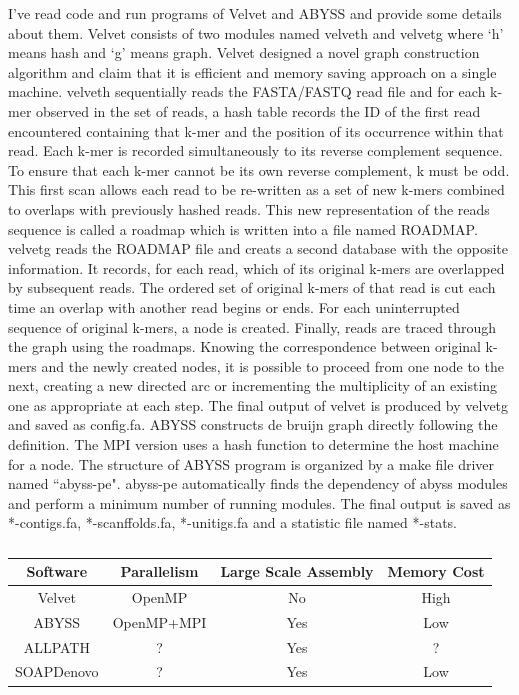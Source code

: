 \documentclass{article}
\begin{document}
I've read code and run programs of Velvet and ABYSS and provide some details about them. Velvet consists of two modules named velveth and velvetg where `h' means hash and `g' means graph. Velvet designed a novel graph construction algorithm and claim that it is efficient and memory saving approach on a single machine. velveth sequentially reads the FASTA/FASTQ read file and for each k-mer observed in the set of reads, a hash table records the ID of the first read encountered containing that k-mer and the position of its occurrence within that read. Each k-mer is recorded simultaneously to its reverse complement sequence. To ensure that each k-mer cannot be its own reverse complement, k must be odd. This first scan allows each read to be re-written as a set of new k-mers combined to overlaps with previously hashed reads. This new representation of the reads sequence is called a roadmap which is written into a file named ROADMAP. velvetg reads the ROADMAP file and creats a second database with the opposite information. It records, for each read, which of its original k-mers are overlapped by subsequent reads. The ordered set of original k-mers of that read is cut each time an overlap with another read begins or ends. For each uninterrupted sequence of original k-mers, a node is created. Finally, reads are traced through the graph using the roadmaps. Knowing the correspondence between original k-mers and the newly created nodes, it is possible to proceed from one node to the next, creating a new directed arc or incrementing the multiplicity of an existing one as appropriate at each step. The final output of velvet is produced by velvetg and saved as config.fa. ABYSS constructs de bruijn graph directly following the definition. The MPI version uses a hash function to determine the host machine for a node. The structure of ABYSS program is organized by a make file driver named ``abyss-pe". abyss-pe automatically finds the dependency of abyss modules and perform a minimum number of running modules. The final output is saved as *-contigs.fa, *-scanffolds.fa, *-unitigs.fa and a statistic file named *-stats.\\
\begin{table}[ht]
\begin{center}
\caption{}\label{comparison_of_assemblers}
\begin{tabular}{c|c|c|c}
\hline
Software & Parallelism & Large Scale Assembly & Memory Cost\\
\hline
Velvet & OpenMP & No & High\\
\hline
ABYSS & OpenMP+MPI & Yes & Low\\
\hline
ALLPATH& ? & Yes & ?\\
\hline
SOAPDenovo & ? & Yes &Low\\
\hline
\end{tabular}
\end{center}
\end{table}
\end{document}
